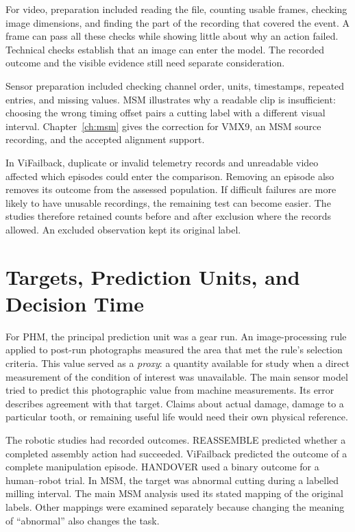 For video, preparation included reading the file, counting usable frames, checking image
dimensions, and finding the part of the recording that covered the event. A frame can
pass all these checks while showing little about why an action failed. Technical checks
establish that an image can enter the model. The recorded outcome and the visible
evidence still need separate consideration.

Sensor preparation included checking channel order, units, timestamps, repeated entries,
and missing values. MSM illustrates why a readable clip is insufficient: choosing the
wrong timing offset pairs a cutting label with a different visual interval.
Chapter~\ref{ch:msm} gives the correction for VMX9, an MSM source recording, and the accepted alignment support.

In ViFailback, duplicate or invalid telemetry records and unreadable video affected
which episodes could enter the comparison. Removing an episode also removes its outcome
from the assessed population. If difficult failures are more likely to have unusable
recordings, the remaining test can become easier. The studies therefore retained counts
before and after exclusion where the records allowed. An excluded observation kept its
original label.

\section{Targets, Prediction Units, and Decision Time}
\label{sec:ch4-targets}

For PHM, the principal prediction unit was a gear run. An image-processing rule applied
to post-run photographs measured the area that met the rule's selection criteria. This
value served as a \emph{proxy}: a quantity available for study when a direct measurement
of the condition of interest was unavailable. The main sensor model tried to predict
this photographic value from machine measurements. Its error describes agreement with
that target. Claims about actual damage, damage to a particular tooth, or remaining
useful life would need their own physical reference.

The robotic studies had recorded outcomes. REASSEMBLE predicted whether a completed
assembly action had succeeded. ViFailback predicted the outcome of a complete
manipulation episode. HANDOVER used a binary outcome for a human--robot trial. In MSM,
the target was abnormal cutting during a labelled milling interval. The main MSM
analysis used its stated mapping of the original labels. Other mappings were examined
separately because changing the meaning of ``abnormal'' also changes the task.

